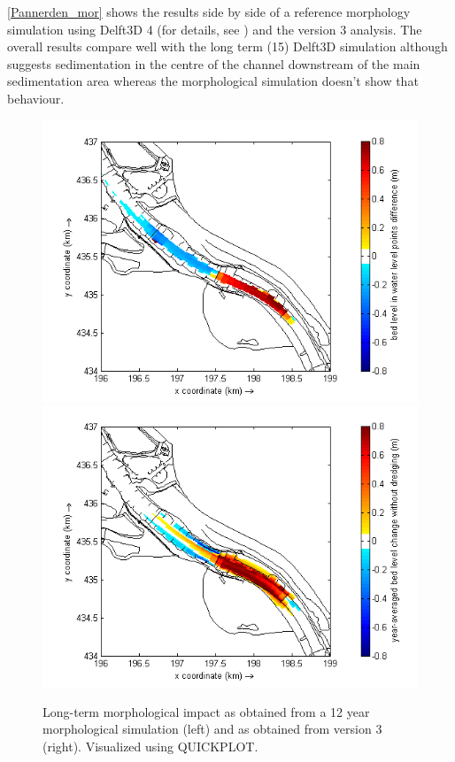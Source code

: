 
\autoref{Pannerden_mor} shows the results side by side of a reference morphology simulation using Delft3D 4 (for details, see \citet{GiriJagers2022}) and the \dfmi version 3 analysis.
The overall \dfmi results compare well with the long term (\SI{15}{\year}) Delft3D simulation although \dfmi suggests sedimentation in the centre of the channel downstream of the main sedimentation area whereas the morphological simulation doesn't show that behaviour.

\begin{figure}[H]
\includegraphics[width=\columnwidth/2]{figures/Pannerden_delft3d.png}
\includegraphics[width=\columnwidth/2]{figures/Pannerden_dfastmi.png}
\caption{Long-term morphological impact as obtained from a 12 year morphological simulation (left) and as obtained from \dfmi version 3 (right).
Visualized using QUICKPLOT.}
\label{Pannerden_mor}
\end{figure}
